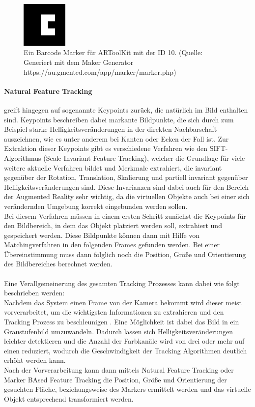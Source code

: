 \begin{figure}[h!]
\centering
\includegraphics[width=0.2\textwidth]{Abbildungen/BarcodeMarker3x3-10.png}
\caption[Barcode Marker]{Ein Barcode Marker für ARToolKit mit der ID 10. (Quelle: Generiert mit dem  Maker Generator https://au.gmented.com/app/marker/marker.php)}
\label{fig:barcode-marker}
\end{figure}


\paragraph{Natural Feature Tracking} greift hingegen auf sogenannte Keypoints zurück, die natürlich im Bild enthalten sind. Keypoints beschreiben dabei markante Bildpunkte, die sich durch zum Beispiel starke Helligkeitsveränderungen in der direkten Nachbarschaft auszeichnen, wie es unter anderem bei Kanten oder Ecken der Fall ist. Zur Extraktion dieser Keypoints gibt es verschiedene Verfahren wie den SIFT-Algorithmus (Scale-Invariant-Feature-Tracking),  welcher die Grundlage für viele weitere aktuelle Verfahren bildet und Merkmale extrahiert, die invariant gegenüber der Rotation, Translation, Skalierung und partiell invariant gegenüber Helligkeitsveränderungen sind\citep[S. 345]{nischwitz:bildverarbeitung}. Diese Invarianzen sind dabei auch für den Bereich der Augmented Reality sehr wichtig, da die virtuellen Objekte auch bei einer sich verändernden Umgebung korrekt eingebunden werden sollen.\\
Bei diesem Verfahren müssen in einem ersten Schritt zunächst die Keypoints für den Bildbereich, in dem das Objekt platziert werden soll, extrahiert und gespeichert werden. Diese Bildpunkte können dann mit Hilfe von Matchingverfahren in den folgenden Frames gefunden werden. Bei einer Übereinstimmung muss dann folglich noch die Position, Größe und Orientierung des Bildbereiches berechnet werden. \\
\\
Eine Verallgemeinerung des gesamten Tracking Prozesses kann dabei wie folgt beschrieben werden:\\
Nachdem das System einen Frame von der Kamera bekommt wird dieser meist vorverarbeitet, um die wichtigsten Informationen zu extrahieren und den Tracking Prozess zu beschleunigen \citep[S. 5]{cukovic:marker-vs-natural}. Eine Möglichkeit ist dabei das Bild in ein Graustufenbild umzuwandeln. Dadurch lassen sich Helligkeitsveränderungen leichter detektieren und die Anzahl der Farbkanäle wird von drei oder mehr auf einen reduziert, wodurch die Geschwindigkeit der Tracking Algorithmen deutlich erhöht werden kann.\\
Nach der Vorverarbeitung kann dann mittels Natural Feature Tracking oder Marker BAsed Feature Tracking die Position, Größe und Orientierung der gesuchten Fläche, beziehungsweise des Markers ermittelt werden und das virtuelle Objekt entsprechend transformiert werden.

